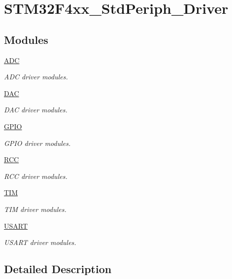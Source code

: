 \hypertarget{group___s_t_m32_f4xx___std_periph___driver}{}\section{S\+T\+M32\+F4xx\+\_\+\+Std\+Periph\+\_\+\+Driver}
\label{group___s_t_m32_f4xx___std_periph___driver}
\subsection*{Modules}
\begin{DoxyCompactItemize}
\item 
\hyperlink{group___a_d_c}{A\+DC}
\begin{DoxyCompactList}\small\item\em A\+DC driver modules. \end{DoxyCompactList}\item 
\hyperlink{group___d_a_c}{D\+AC}
\begin{DoxyCompactList}\small\item\em D\+AC driver modules. \end{DoxyCompactList}\item 
\hyperlink{group___g_p_i_o}{G\+P\+IO}
\begin{DoxyCompactList}\small\item\em G\+P\+IO driver modules. \end{DoxyCompactList}\item 
\hyperlink{group___r_c_c}{R\+CC}
\begin{DoxyCompactList}\small\item\em R\+CC driver modules. \end{DoxyCompactList}\item 
\hyperlink{group___t_i_m}{T\+IM}
\begin{DoxyCompactList}\small\item\em T\+IM driver modules. \end{DoxyCompactList}\item 
\hyperlink{group___u_s_a_r_t}{U\+S\+A\+RT}
\begin{DoxyCompactList}\small\item\em U\+S\+A\+RT driver modules. \end{DoxyCompactList}\end{DoxyCompactItemize}


\subsection{Detailed Description}
